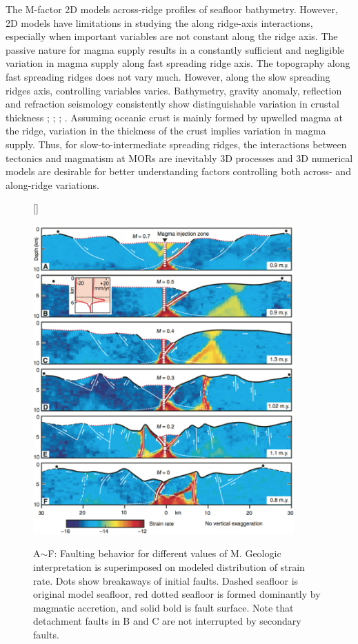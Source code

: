 \documentclass[12pt]{article}
\begin{document}
The M-factor  2D models   across-ridge profiles of seafloor bathymetry. However, 2D models have limitations in studying the along ridge-axis interactions, especially when important variables are not constant along the ridge axis. The passive nature for magma supply results in a constantly sufficient and negligible variation in magma supply along fast spreading ridge axis. The topography along fast spreading ridges does not vary much. However, along the slow spreading ridges axis, controlling variables varies. Bathymetry, gravity anomaly, reflection and refraction seismology consistently show distinguishable variation in crustal thickness \citep{Ryan2009}; \citep{Chen1999}; \citep{Lin1990}; \citep{Tolstoy1993}. Assuming oceanic crust is mainly formed by upwelled magma at the ridge, variation in the thickness of the crust implies variation in magma supply. Thus, for slow-to-intermediate spreading ridges, the interactions between tectonics and magmatism at MORs are inevitably 3D processes and 3D numerical models are desirable for better understanding factors controlling both across- and along-ridge variations. 
\begin{figure}[H]
[\FBwidth]
{\caption{\small A$\sim$F: Faulting behavior for different values of M. Geologic interpretation is superimposed on modeled distribution of strain rate. Dots show breakaways of initial faults. Dashed seafloor is original model seafloor, red dotted seafloor is formed dominantly by magmatic accretion, and solid bold is fault surface. Note that detachment faults in B and C are not interrupted by secondary faults. \citep{Tucholke2008}}}
 {\includegraphics[width=10cm]{fig6_1.png}} 
 \label{fig6_1}
\end{figure}
\end{document}
